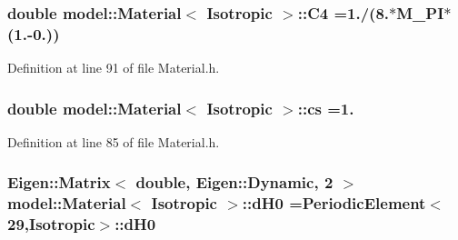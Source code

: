 \hypertarget{classmodel_1_1_material_3_01_isotropic_01_4_a6a8832be4971bb5d8c099ace3b96b7e7}{}
\subsubsection[{C4}]{\setlength{\rightskip}{0pt plus 5cm}double {\bf model\+::\+Material}$<$ {\bf Isotropic} $>$\+::C4 =1./(8.$\ast$M\+\_\+\+P\+I$\ast$(1.-\/0.))\hspace{0.3cm}{\ttfamily [static]}}\label{classmodel_1_1_material_3_01_isotropic_01_4_a6a8832be4971bb5d8c099ace3b96b7e7}


Definition at line 91 of file Material.\+h.

\hypertarget{classmodel_1_1_material_3_01_isotropic_01_4_a5042b3bcd496c68eab5430543476d70e}{}
\subsubsection[{cs}]{\setlength{\rightskip}{0pt plus 5cm}double {\bf model\+::\+Material}$<$ {\bf Isotropic} $>$\+::cs =1.\hspace{0.3cm}{\ttfamily [static]}}\label{classmodel_1_1_material_3_01_isotropic_01_4_a5042b3bcd496c68eab5430543476d70e}


Definition at line 85 of file Material.\+h.

\hypertarget{classmodel_1_1_material_3_01_isotropic_01_4_a0b5ba4de6e8bc6b8303ad3b95ae19dd6}{}
\subsubsection[{d\+H0}]{\setlength{\rightskip}{0pt plus 5cm}Eigen\+::\+Matrix$<$ double, Eigen\+::\+Dynamic, 2 $>$ {\bf model\+::\+Material}$<$ {\bf Isotropic} $>$\+::d\+H0 ={\bf Periodic\+Element}$<$29,{\bf Isotropic}$>$\+::d\+H0\hspace{0.3cm}{\ttfamily [static]}}\label{classmodel_1_1_material_3_01_isotropic_01_4_a0b5ba4de6e8bc6b8303ad3b95ae19dd6}


